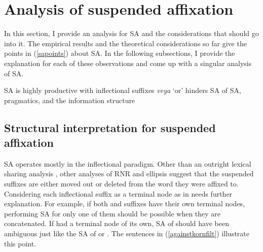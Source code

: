 \section{Analysis of suspended affixation} \label{sec:SAanalysis}

In this section, I provide an analysis for SA and the considerations that should go into it. The empirical results and the theoretical considerations so far give the points in (\ref{sapoints}) about SA. In the following subsections, I provide the explanation for each of these observations and come up with a singular analysis of SA.

\begin{exe}
\ex \label{sapoints}
    \begin{xlisti}
    \ex SA is highly productive with inflectional suffixes
    \ex \textit{veya} `or' hinders SA of {\Case} 
    \ex SA, pragmatics, and the information structure
    \end{xlisti}
\end{exe}

\subsection{Structural interpretation for suspended affixation}

SA operates mostly in the inflectional paradigm. Other than an outright lexical sharing analysis \citep{broadwell2008turkish}, other analyses of RNR \citep{kornfilt2012revisiting} and ellipsis \citep{guseva2017postsyntactic, erschler2018suspended} suggest that the suspended suffixes are either moved out or deleted from the word they were affixed to. Considering each inflectional suffix as a terminal node as in \citet{kornfilt2012revisiting} needs further explanation. For example, if both {\Pl} and {\Poss} suffixes have their own terminal nodes, performing SA for only one of them should be possible when they are concatenated. If {\Case} had a terminal node of its own, SA of {\Acc} should have been ambiguous just like the SA of {\Pl} or {\Poss}. The sentences in (\ref{againstkornfilt}) illustrate this point.

